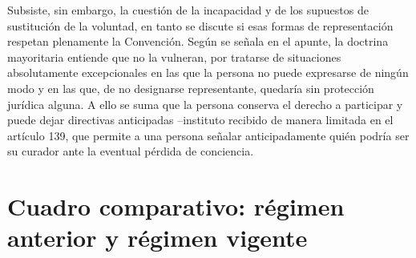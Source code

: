 \documentclass[12pt,oneside]{book}
\begin{document}
Subsiste, sin embargo, la cuestión de la incapacidad y de los supuestos de sustitución de la voluntad, en tanto se discute si esas formas de representación respetan plenamente la Convención. Según se señala en el apunte, la doctrina mayoritaria entiende que no la vulneran, por tratarse de situaciones absolutamente excepcionales en las que la persona no puede expresarse de ningún modo y en las que, de no designarse representante, quedaría sin protección jurídica alguna. A ello se suma que la persona conserva el derecho a participar y puede dejar directivas anticipadas --instituto recibido de manera limitada en el artículo 139, que permite a una persona señalar anticipadamente quién podría ser su curador ante la eventual pérdida de conciencia.

\section{Cuadro comparativo: régimen anterior y régimen vigente}
\end{document}
